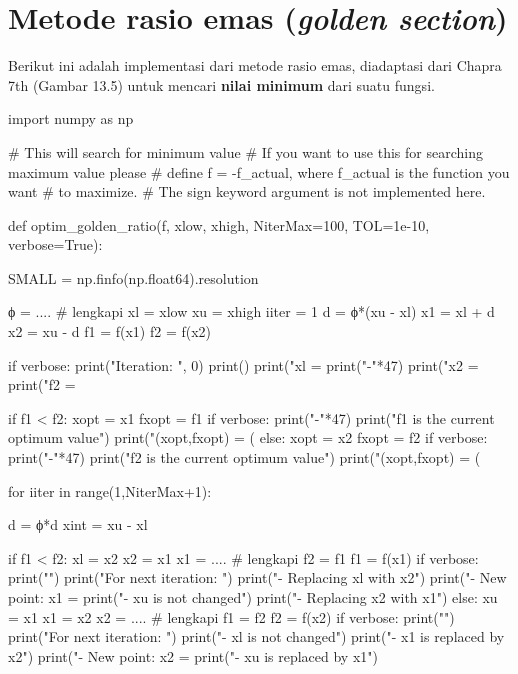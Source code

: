 \section{Metode rasio emas (\textit{golden section})}

Berikut ini adalah implementasi dari metode rasio emas,
diadaptasi dari Chapra 7th (Gambar 13.5) untuk mencari
\textbf{nilai minimum} dari suatu fungsi.

\begin{pythoncode}
import numpy as np

# This will search for minimum value
# If you want to use this for searching maximum value please
# define f = -f_actual, where f_actual is the function you want
# to maximize.
# The sign keyword argument is not implemented here.

def optim_golden_ratio(f, xlow, xhigh, NiterMax=100, TOL=1e-10, verbose=True):

    SMALL = np.finfo(np.float64).resolution

    ϕ = .... # lengkapi
    xl = xlow
    xu = xhigh
    iiter = 1
    d = ϕ*(xu - xl)
    x1 = xl + d
    x2 = xu - d
    f1 = f(x1)
    f2 = f(x2)

    if verbose:
        print("Iteration: ", 0)
        print()
        print("xl = %
        print("-"*47)
        print("x2 = %
        print("f2 = %

    if f1 < f2:
        xopt = x1
        fxopt = f1
        if verbose:
            print("-"*47)
            print("f1 is the current optimum value")
            print("(xopt,fxopt) = (%
    else:
        xopt = x2
        fxopt = f2
        if verbose:
            print("-"*47)
            print("f2 is the current optimum value")
            print("(xopt,fxopt) = (%

    for iiter in range(1,NiterMax+1):

        d = ϕ*d
        xint = xu - xl

        if f1 < f2:
            xl = x2
            x2 = x1
            x1 = .... # lengkapi
            f2 = f1
            f1 = f(x1)
            if verbose:
                print("")
                print("For next iteration: ")
                print("- Replacing xl with x2")
                print("- New point: x1 = %
                print("- xu is not changed")
                print("- Replacing x2 with x1")
        else:
            xu = x1
            x1 = x2
            x2 = .... # lengkapi
            f1 = f2
            f2 = f(x2)
            if verbose:
                print("")
                print("For next iteration: ")
                print("- xl is not changed")
                print("- x1 is replaced by x2")
                print("- New point: x2 = %
                print("- xu is replaced by x1")


\end{pythoncode}
